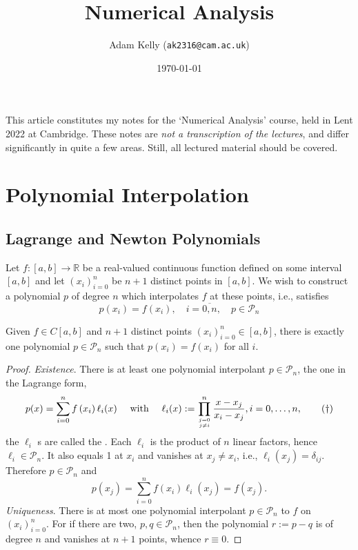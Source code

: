 \documentclass[a4paper]{scrartcl}
\title{Numerical Analysis}
\author{Adam Kelly (\texttt{ak2316@cam.ac.uk})}
\date{\today}
\begin{document}
\maketitle


This article constitutes my notes for the `Numerical Analysis' course, held in Lent 2022 at Cambridge. These notes are \emph{not a transcription of the lectures}, and differ significantly in quite a few areas. Still, all lectured material should be covered.


\tableofcontents


\section{Polynomial Interpolation}

\subsection{Lagrange and Newton Polynomials}

Let $f:[a, b] \rightarrow \mathbb{R}$ be a real-valued continuous function defined on some interval $[a, b]$ and let $\left(x_{i}\right)_{i=0}^{n}$ be $n+1$ distinct points in $[a, b]$. We wish to construct a polynomial $p$ of degree $n$ which interpolates $f$ at these points, i.e., satisfies
$$
p\left(x_{i}\right)=f\left(x_{i}\right), \quad i=\overline{0, n}, \quad p \in \mathcal{P}_{n}
$$

\begin{theorem}
Given $f \in C[a, b]$ and $n+1$ distinct points $\left(x_{i}\right)_{i=0}^{n} \in[a, b]$, there is exactly one polynomial $p \in \mathcal{P}_{n}$ such that $p\left(x_{i}\right)=f\left(x_{i}\right)$ for all $i$.
\end{theorem}
\begin{proof}
  \emph{Existence}. There is at least one polynomial interpolant $p \in \mathcal{P}_{n}$, the one in the Lagrange form,
  \begin{equation}\label{eq:1}
p(x)=\sum_{i=0}^{n} f\left(x_{i}\right) \ell_{i}(x) \quad \text { with } \quad \ell_{i}(x):=\prod_{j=0 \atop j \neq i}^{n} \frac{x-x_{j}}{x_{i}-x_{j}}, i = 0, \dots, n,\tag{$\dagger$}
  \end{equation}
the $\ell_{i}$ s are called the . Each $\ell_{i}$ is the product of $n$ linear factors, hence $\ell_{i} \in \mathcal{P}_{n}$. It also equals 1 at $x_{i}$ and vanishes at $x_{j} \neq x_{i}$, i.e., $\ell_{i}\left(x_{j}\right)=\delta_{i j}$. Therefore $p \in \mathcal{P}_{n}$ and
$$
p\left(x_{j}\right)=\sum_{i=0}^{n} f\left(x_{i}\right) \ell_{i}\left(x_{j}\right)=f\left(x_{j}\right) .
$$
\emph{Uniqueness}. There is at most one polynomial interpolant $p \in \mathcal{P}_{n}$ to $f$ on $\left(x_{i}\right)_{i=0}^{n}$. For if there are two, $p, q \in \mathcal{P}_{n}$, then the polynomial $r:=p-q$ is of degree $n$ and vanishes at $n+1$ points, whence $r \equiv 0$.
\end{proof}
\end{document}
